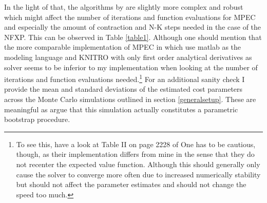 In the light of that, the algorithms by \citeauthor{Iskhakov.2016} are slightly more complex and robust which might affect the number of iterations and function evaluations for MPEC and especially the amount of contraction and N-K steps needed in the case of the NFXP. This can be observed in Table \ref{table1}. Although one should mention that the more comparable implementation of MPEC in which \cite{Su.Judd.2012} use matlab as the modeling language and KNITRO with only first order analytical derivatives as solver seems to be inferior to my implementation when looking at the number of iterations and function evaluations needed.\footnote{ To see this, have a look at Table II on page 2228 of \cite{Su.Judd.2012} One has to be cautious, though, as their implementation differs from mine in the sense that they do not recenter the expected value function. Although this should generally only cause the solver to converge more often due to increased numerically stability but should not affect the parameter estimates and should not change the speed too much.} For an additional sanity check I provide the mean and standard deviations of the estimated cost parameters across the Monte Carlo simulations outlined in section \ref{generalsetup}. These are meaningful as \cite{Su.Judd.2012} argue that this simulation actually constitutes a parametric bootstrap procedure.

